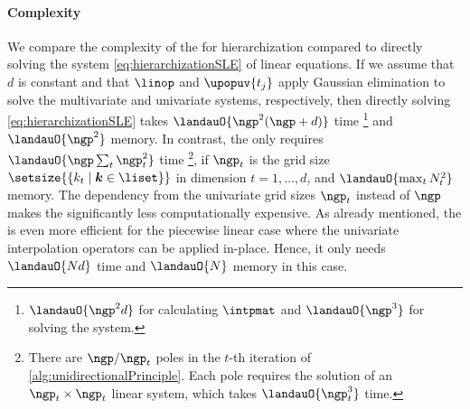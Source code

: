 \paragraph{Complexity}

We compare the complexity of the \up for hierarchization compared
to directly solving the system \eqref{eq:hierarchizationSLE} of
linear equations.
If we assume that $d$ is constant and that
$\linop$ and $\upopuv{t_j}$ apply Gaussian elimination to
solve the multivariate and univariate systems, respectively,
then directly solving \eqref{eq:hierarchizationSLE} takes
$\landauO{\ngp^2 (\ngp + d)}$ time%
\footnote{%
  $\landauO{\ngp^2 d}$ for calculating $\intpmat$ and
  $\landauO{\ngp^3}$ for solving the system.
}
and
$\landauO{\ngp^2}$ memory.
In contrast, the \up only requires
$\landauO{\ngp \sum_t \ngp_t^2}$ time%
\footnote{%
  There are $\ngp/\ngp_t$ poles in the
  $t$-th iteration of \cref{alg:unidirectionalPrinciple}.
  Each pole requires the solution of an $\ngp_t \times \ngp_t$ linear system,
  which takes $\landauO{\ngp_t^3}$ time.
},
if $\ngp_t$ is the grid size
$\setsize{\{k_t \mid \*k \in \liset\}}$ in dimension $t = 1, \dotsc, d$,
and $\landauO{\max_t N_t^2}$ memory.
The dependency from the univariate grid sizes $\ngp_t$ instead of $\ngp$
makes the \up significantly less computationally expensive.
As already mentioned,
the \up is even more efficient for the piecewise linear case
where the univariate interpolation operators can be applied
in-place.
Hence, it only needs $\landauO{Nd}$ time and
$\landauO{N}$ memory in this case.
